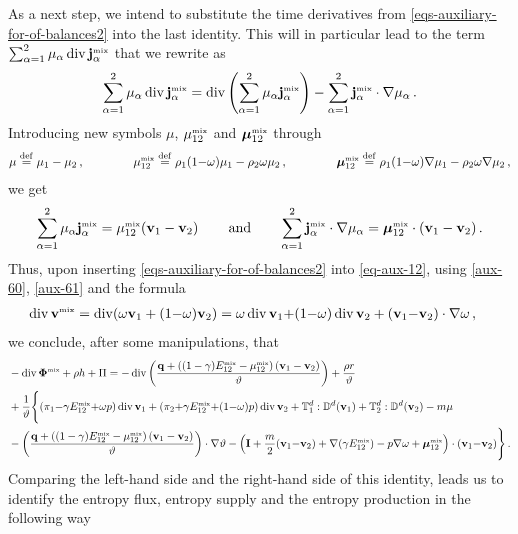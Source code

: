 \documentclass[a4paper]{article}
\begin{document}
As a next step, we intend to substitute the time derivatives from \eqref{eqs-auxiliary-for-of-balances2} into the last identity. This will in particular lead to the term $\sum_{\alpha=1}^2 \mu_\alpha \mathop{\rm div}\nolimits{\bf j}^{\mbox{\tiny{mix}}}_\alpha$ that we rewrite as
\begin{equation}
\label{aux-60}
\sum_{\alpha=1}^2 \mu_\alpha \mathop{\rm div}\nolimits{\bf j}^{\mbox{\tiny{mix}}}_\alpha = \mathop{\rm div}\nolimits\left(\sum_{\alpha=1}^2\mu_\alpha{\bf j}^{\mbox{\tiny{mix}}}_\alpha\right) - \sum_{\alpha=1}^2{\bf j}^{\mbox{\tiny{mix}}}_\alpha\cdot\nabla\mu_\alpha\,.
\end{equation}
Introducing new symbols $\mu$, $\mu_{12}^{\mbox{\tiny{mix}}}$ and $\boldsymbol{\mu}_{12}^{\mbox{\tiny{mix}}}$ through
\begin{align}
\label{def-mumixvec}
\mu\stackrel{\mathrm{def}}{=}\mu_1 - \mu_2\,,\qquad\qquad
 \mu_{12}^{\mbox{\tiny{mix}}}\stackrel{\mathrm{def}}{=} \rho_1(1{-}\omega)\mu_1 - \rho_2\omega\mu_2\,,\qquad\qquad
 \boldsymbol{\mu}_{12}^{\mbox{\tiny{mix}}}\stackrel{\mathrm{def}}{=} \rho_1(1{-}\omega)\nabla\mu_1 - \rho_2\omega\nabla\mu_2\,, 
\end{align}
we get
\begin{align}
\label{aux-61}
    \sum_{\alpha=1}^2\mu_\alpha {\bf j}^{\mbox{\tiny{mix}}}_\alpha = \mu_{12}^{\mbox{\tiny{mix}}}({\bf v}_1-{\bf v}_2)\,\qquad\text{and}\qquad
    \sum_{\alpha=1}^2{\bf j}^{\mbox{\tiny{mix}}}_\alpha\cdot\nabla\mu_\alpha =\boldsymbol{\mu}_{12}^{\mbox{\tiny{mix}}}\cdot({\bf v}_1-{\bf v}_2)\,.
\end{align}
Thus, upon inserting \eqref{eqs-auxiliary-for-of-balances2} into \eqref{eq-aux-12}, 
using \eqref{aux-60}, \eqref{aux-61} and the formula
\begin{align}
\nonumber
\mathop{\rm div}\nolimits{\bf v}^{\mbox{\tiny{mix}}} &= \mathop{\rm div}\nolimits(\omega{\bf v}_1+(1{-}\omega){\bf v}_2) = \omega\mathop{\rm div}\nolimits{\bf v}_1{+}(1{-}\omega)\mathop{\rm div}\nolimits{\bf v}_2 + ({\bf v}_1{-}{\bf v}_2)\cdot\nabla \omega\,,
\end{align}
we conclude, after some manipulations, that
\begin{align}
\nonumber
	& 
    -\mathop{\rm div}\nolimits\mbox{\boldmath $\Phi$} ^{\mbox{\tiny{mix}}} + 	\rho h + \Pi =
	-\mathop{\rm div}\nolimits\left(\frac{{\bf{q}}+\left((1-\gamma)E_{12}^{\mbox{\tiny{mix}}} -\mu_{12}^{\mbox{\tiny{mix}}}\right)({\bf v}_1-{\bf v}_2)}{\vartheta}\right)+\frac{\rho r}{\vartheta}\\\nonumber &+ \frac{1}{\vartheta}\Bigg\{  (\pi_1{-}\gamma E_{12}^{\mbox{\tiny{mix}}}{+}\omega p)\mathop{\rm div}\nolimits{\bf v}_1 + (\pi_2{+}\gamma E_{12}^{\mbox{\tiny{mix}}}{+}(1{-}\omega)p)\mathop{\rm div}\nolimits{\bf v}_2 + \mathbb{T}^d_1:\mathbb{D}^d({\bf v}_1) + \mathbb{T}^d_2:\mathbb{D}^d({\bf v}_2)  -m \mu  \\\label{eq-entropy-bal-final} &  -\left(\frac{{\bf{q}}+\left((1-\gamma)E_{12}^{\mbox{\tiny{mix}}} -\mu_{12}^{\mbox{\tiny{mix}}}\right)({\bf v}_1-{\bf v}_2)}{\vartheta}\right)\cdot\nabla\vartheta - \left({\mathbf{I}} + \frac{m}{2}({\bf v}_1{-}{\bf v}_2) + \nabla(\gamma E_{12}^{\mbox{\tiny{mix}}}) - p\nabla \omega + \boldsymbol{\mu}_{12}^{\mbox{\tiny{mix}}}  \right)\cdot({\bf v}_1{-}{\bf v}_2)
	\Bigg\}\,.
\end{align}
Comparing the left-hand side and the right-hand side of this identity, leads us to identify the entropy flux, entropy supply and the entropy production in the following way
\end{document}
